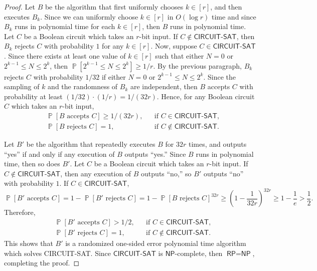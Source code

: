 \documentclass[letterpaper, reqno,11pt]{article}
\newcommand{\PP}{\mathop{{}\mathbb{P}}}
\begin{document}
\begin{enumerate}
\begin{proof}
    Let $B$ be the algorithm that first uniformly chooses $k \in [r]$, and then executes $B_k$. Since we can uniformly choose $k \in [r]$ in $O(\log r)$ time and since $B_k$ runs in polynomial time for each $k \in [r]$, then $B$ runs in polynomial time. Let $C$ be a Boolean circuit which takes an $r$-bit input. If $C \not \in \textsf{CIRCUIT-SAT}$, then $B_k$ rejects $C$ with probability $1$ for any $k \in [r]$. Now, suppose $C \in \textsf{CIRCUIT-SAT}$. Since there exists at least one value of $k \in [r]$ such that either $N = 0$ or $2^{k - 1} \leq N \leq 2^k$, then $\PP[2^{k - 1} \leq N \leq 2^k] \geq 1/r$. By the previous paragraph, $B_k$ rejects $C$ with probability $1/32$ if either $N = 0$ or $2^{k - 1} \leq N \leq 2^k$. Since the sampling of $k$ and the randomness of $B_k$ are independent, then $B$ accepts $C$ with probability at least $(1/32) \cdot (1/r) = 1/(32r)$. Hence, for any Boolean circuit $C$ which takes an $r$-bit input,
    \begin{align*}
      & \PP[\text{$B$ accepts $C$}] \geq 1/(32r), && \text{if $C \in \textsf{CIRCUIT-SAT}$}, \\
      & \PP[\text{$B$ rejects $C$}] = 1, && \text{if $C \not \in \textsf{CIRCUIT-SAT}$}.
    \end{align*}

    Let $B'$ be the algorithm that repeatedly executes $B$ for $32r$ times, and outputs ``yes'' if and only if any execution of $B$ outputs ``yes.'' Since $B$ runs in polynomial time, then so does $B'$. Let $C$ be a Boolean circuit which takes an $r$-bit input. If $C \not \in \textsf{CIRCUIT-SAT}$, then any execution of $B$ outputs ``no,'' so $B'$ outputs ``no'' with probability $1$. If $C \in \textsf{CIRCUIT-SAT}$,
    $$ \PP\left[\text{$B'$ accepts $C$}\right] = 1 - \PP\left[\text{$B'$ rejects $C$}\right] = 1 - \PP[\text{$B$ rejects $C$}]^{32r} \geq \left(1 - \frac{1}{32r}\right)^{32r} \geq 1 - \frac{1}{e} > \frac{1}{2}. $$
    Therefore,
    \begin{align*}
      & \PP\left[\text{$B'$ accepts $C$}\right] > 1/2, && \text{if $C \in \textsf{CIRCUIT-SAT}$}, \\
      & \PP\left[\text{$B'$ rejects $C$}\right] = 1, && \text{if $C \not \in \textsf{CIRCUIT-SAT}$}.
    \end{align*}
    This shows that $B'$ is a randomized one-sided error polynomial time algorithm which solves \textsf{CIRCUIT-SAT}. Since $\textsf{CIRCUIT-SAT}$ is $\textsf{NP}$-complete, then $\textsf{RP} = \textsf{NP}$, completing the proof.
  \end{proof}
\end{enumerate}
\end{document}
